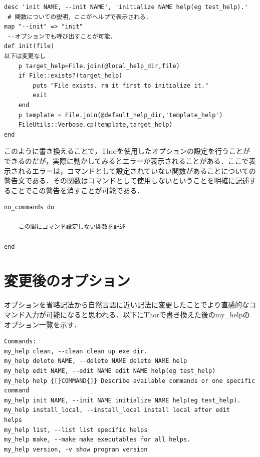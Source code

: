 \begin{screen}
{\small
\begin{verbatim}
desc 'init NAME, --init NAME', 'initialize NAME help(eg test_help).'
 # 関数についての説明，ここがヘルプで表示される．
map "--init" => "init"
 --オプションでも呼び出すことが可能．
def init(file)
以下は変更なし
    p target_help=File.join(@local_help_dir,file)
    if File::exists?(target_help)
        puts "File exists. rm it first to initialize it."
        exit
    end
    p template = File.join(@default_help_dir,'template_help')
    FileUtils::Verbose.cp(template,target_help)
end
\end{verbatim}}
\end{screen}

このように書き換えることで，Thorを使用したオプションの設定を行うことができるのだが，実際に動かしてみるとエラーが表示されることがある．ここで表示されるエラーは，コマンドとして設定されていない関数があることについての警告文である．その関数はコマンドとして使用しないということを明確に記述することでこの警告を消すことが可能である．

\begin{screen}
{\small
\begin{verbatim}
no_commands do

    この間にコマンド設定しない関数を記述

end
\end{verbatim}}
\end{screen}

\section{変更後のオプション}\label{}

オプションを省略記法から自然言語に近い記法に変更したことでより直感的なコマンド入力が可能になると思われる．以下にThorで書き換えた後のmy\_helpのオプション一覧を示す．

\begin{screen}
{\small
\begin{verbatim}
Commands:
my_help clean, --clean clean up exe dir.
my_help delete NAME, --delete NAME delete NAME help
my_help edit NAME, --edit NAME edit NAME help(eg test_help)
my_help help {[}COMMAND{]} Describe available commands or one specific
command
my_help init NAME, --init NAME initialize NAME help(eg test_help).
my_help install_local, --install_local install local after edit
helps
my_help list, --list list specific helps
my_help make, --make make executables for all helps.
my_help version, -v show program version
\end{verbatim}}
\end{screen}

